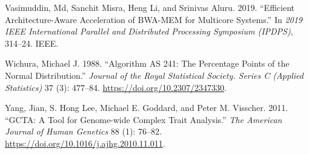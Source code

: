 \documentclass[
]{book}
\newlength{\cslhangindent}
\newlength{\cslentryspacingunit} %
\newenvironment{CSLReferences}[2] %
 {%
  \setlength{\parindent}{0pt}
  \ifodd #1
  \let\oldpar\par
  \def\par{\hangindent=\cslhangindent\oldpar}
  \fi
  \setlength{\parskip}{#2\cslentryspacingunit}
 }%
 {}
\begin{document}
\begin{CSLReferences}{1}{0}
\leavevmode{}%
Vasimuddin, Md, Sanchit Misra, Heng Li, and Srinivas Aluru. 2019. {``Efficient Architecture-Aware Acceleration of {BWA-MEM} for Multicore Systems.''} In \emph{2019 {IEEE International Parallel} and {Distributed Processing Symposium} ({IPDPS})}, 314--24. {IEEE}.

\leavevmode{}%
Wichura, Michael J. 1988. {``Algorithm {AS} 241: {The Percentage Points} of the {Normal Distribution}.''} \emph{Journal of the Royal Statistical Society. Series C (Applied Statistics)} 37 (3): 477--84. \url{https://doi.org/10.2307/2347330}.

\leavevmode{}%
Yang, Jian, S. Hong Lee, Michael E. Goddard, and Peter M. Visscher. 2011. {``{GCTA}: {A Tool} for {Genome-wide Complex Trait Analysis}.''} \emph{The American Journal of Human Genetics} 88 (1): 76--82. \url{https://doi.org/10.1016/j.ajhg.2010.11.011}.

\end{CSLReferences}
\end{document}
